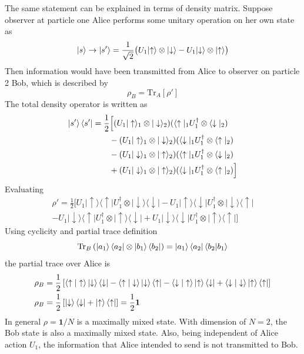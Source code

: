 \documentclass[../../../main.tex]{subfiles}
\begin{document}
The same statement can be explained in terms of density matrix.
Suppose observer at particle one Alice performs some unitary operation  on her own state as
\begin{equation*}
  \ket{s} \to |s'\rangle = \frac{1}{\sqrt{2}}\bigl(U_1\lvert\uparrow\rangle\otimes\lvert\downarrow\rangle - U_1\lvert\downarrow\rangle\otimes\lvert\uparrow\rangle\bigr)
\end{equation*}
Then information would have been transmitted from Alice to observer on particle 2 Bob, which is described by
\begin{equation*}
  \rho_B = \mathrm{Tr} _A [\rho']
\end{equation*}
The total density operator is written as
\begin{align*}
  \ket{s' }\bra{s'}
   & =  \frac{1}{2}\Big[(U_1|\uparrow\rangle_1\otimes|\downarrow\rangle_2)(\langle\uparrow|_1U_1^\dagger\otimes\langle\downarrow|_2) \\
   & \qquad-(U_1|\uparrow\rangle_1\otimes|\downarrow\rangle_2)(\langle\downarrow|_1U_1^\dagger\otimes\langle\uparrow|_2)             \\
   & \qquad-(U_1|\downarrow\rangle_1\otimes|\uparrow\rangle_2)(\langle\uparrow|_1U_1^\dagger\otimes\langle\downarrow|_2)             \\
   & \qquad +(U_1|\downarrow\rangle_1\otimes|\uparrow\rangle_2)(\langle\downarrow|_1U_1^\dagger\otimes\langle\uparrow|_2)\Big]
\end{align*}
Evaluating
\begin{multline*}
  \rho'
  =\frac{1}{2}\Big[U_{1}\lvert\uparrow\rangle\langle\uparrow\rvert U_{1}^{\dagger}\otimes\lvert\downarrow\rangle\langle\downarrow\rvert
    - U_{1}\lvert\uparrow\rangle\langle\downarrow\rvert U_{1}^{\dagger}\otimes\lvert\downarrow\rangle\langle\uparrow\rvert\\
    - U_{1}\lvert\downarrow\rangle\langle\uparrow\rvert U_{1}^{\dagger}\otimes\lvert\uparrow\rangle\langle\downarrow\rvert
    + U_{1}\lvert\downarrow\rangle\langle\downarrow\rvert U_{1}^{\dagger}\otimes\lvert\uparrow\rangle\langle\uparrow\rvert\Big]
\end{multline*}
Using cyclicity and partial trace definition
\begin{equation*}
  \mathrm{Tr}_B \left(\ket{a_1}\bra{a_2}\otimes \ket{b_1} \bra{b_2}  \right)  = \ket{a_1}\bra{a_2} \braket{b_2|b_1}
\end{equation*}
the partial trace over Alice is
\begin{align*}
  \rho_B & =  \frac{1 }{2 }\left[ \braket{\uparrow | \uparrow} \ket{ \downarrow }\bra{\downarrow} -\braket{\uparrow | \downarrow} \ket{ \downarrow }\bra{\uparrow}  - \braket{\downarrow | \uparrow} \ket{ \uparrow }\bra{\downarrow}+\braket{\downarrow | \downarrow} \ket{ \uparrow }\bra{\uparrow}\right] \\
  \rho_B & = \frac{1 }{2 }\left[ \ket{\downarrow }\bra{\downarrow}+ \ket{\uparrow }\bra{\uparrow} \right]
  = \frac{1 }{2 }\mathbf{1}
\end{align*}
In general $\rho = \mathbf{1}/N$ is a maximally mixed state.
With dimension of $N=2$, the Bob state is also a maximally mixed state.
Also, being independent of Alice action $U_1$, the information that Alice intended to send is not transmitted to Bob.
\end{document}
